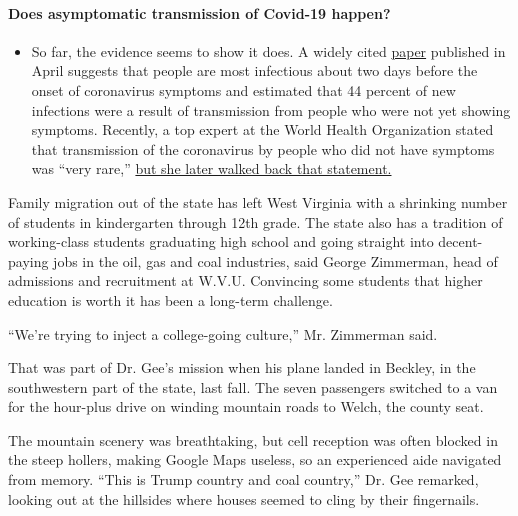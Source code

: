 \begin{itemize}
{  \paragraph{Does asymptomatic transmission of Covid-19
  happen?}\label{does-asymptomatic-transmission-of-covid-19-happen}}

  \begin{itemize}
  \tightlist
  \item
    So far, the evidence seems to show it does. A widely cited
    \href{https://www.nature.com/articles/s41591-020-0869-5}{paper}
    published in April suggests that people are most infectious about
    two days before the onset of coronavirus symptoms and estimated that
    44 percent of new infections were a result of transmission from
    people who were not yet showing symptoms. Recently, a top expert at
    the World Health Organization stated that transmission of the
    coronavirus by people who did not have symptoms was ``very rare,''
    \href{https://www.nytimes.com/2020/06/09/world/coronavirus-updates.html?action=click\&pgtype=Article\&state=default\&region=MAIN_CONTENT_3\&context=storylines_faq\#link-1f302e21}{but
    she later walked back that statement.}
  \end{itemize}
\end{itemize}

Family migration out of the state has left West Virginia with a
shrinking number of students in kindergarten through 12th grade. The
state also has a tradition of working-class students graduating high
school and going straight into decent-paying jobs in the oil, gas and
coal industries, said George Zimmerman, head of admissions and
recruitment at W.V.U. Convincing some students that higher education is
worth it has been a long-term challenge.

``We're trying to inject a college-going culture,'' Mr. Zimmerman said.

That was part of Dr. Gee's mission when his plane landed in Beckley, in
the southwestern part of the state, last fall. The seven passengers
switched to a van for the hour-plus drive on winding mountain roads to
Welch, the county seat.

The mountain scenery was breathtaking, but cell reception was often
blocked in the steep hollers, making Google Maps useless, so an
experienced aide navigated from memory. ``This is Trump country and coal
country,'' Dr. Gee remarked, looking out at the hillsides where houses
seemed to cling by their fingernails.

